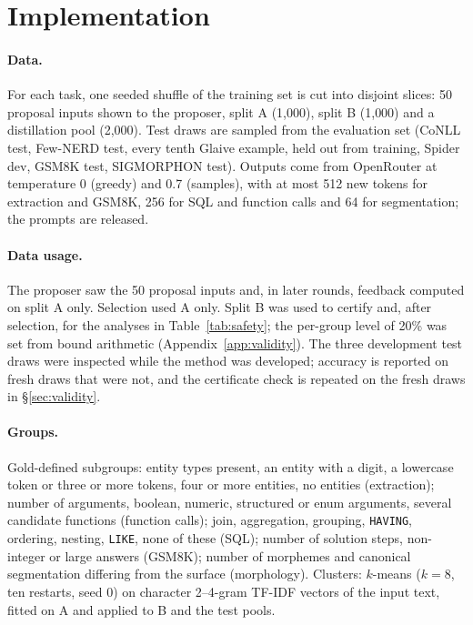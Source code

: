 \documentclass[11pt]{article}
\begin{document}
\section{Implementation}\label{app:impl}
\paragraph{Data.} For each task, one seeded shuffle of the training set is
cut into disjoint slices: 50 proposal inputs shown to the proposer, split A
(1{,}000), split B (1{,}000) and a distillation pool (2{,}000). Test draws
are sampled from the evaluation set (CoNLL test, Few-NERD test, every tenth Glaive example, held out from
training, Spider dev, GSM8K test, SIGMORPHON test). Outputs come from
OpenRouter at temperature 0 (greedy) and 0.7 (samples), with at most 512
new tokens for extraction and GSM8K, 256 for SQL and function calls and 64
for segmentation; the prompts are released.
\paragraph{Data usage.} The proposer saw the 50 proposal inputs and, in
later rounds, feedback computed on split A only. Selection used A only.
Split B was used to certify and, after selection, for the analyses in
Table~\ref{tab:safety}; the per-group level of 20\% was set from bound
arithmetic (Appendix~\ref{app:validity}). The three development test draws
were inspected while the method was developed; accuracy is reported on
fresh draws that were not, and the certificate check is repeated on the
fresh draws in \S\ref{sec:validity}.
\paragraph{Groups.} Gold-defined subgroups: entity types present, an
entity with a digit, a lowercase token or three or more tokens, four or more
entities, no entities (extraction); number of arguments, boolean, numeric,
structured or enum arguments, several candidate functions (function
calls); join, aggregation, grouping, \texttt{HAVING}, ordering, nesting,
\texttt{LIKE}, none of these (SQL); number of solution steps, non-integer or large answers (GSM8K);
number of morphemes and canonical segmentation differing from the surface
(morphology). Clusters: $k$-means ($k=8$, ten restarts, seed 0) on
character 2--4-gram TF-IDF vectors of the input text, fitted on A and
applied to B and the test pools.
\end{document}
